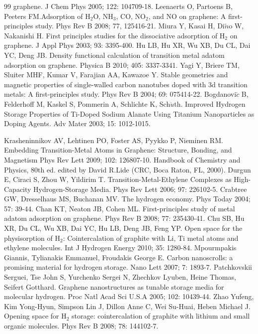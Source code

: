 {\begin{thebibliography} {99}
graphene. J Chem Phys 2005; 122: 104709-18.
Leenaerts O, Partoens B, Peeters FM.Adsorption of H$_{2}$O, NH$_{3}$, CO, NO$_{2}$, and NO on graphene: A first-principles
study. Phys Rev B 2008; 77, 125416-21.
Miura Y, Kasai H, Di$\tilde{n}$o W, Nakanishi H. First principles studies for the dissociative adsorption of H$_{2}$ on
graphene. J Appl Phys 2003; 93: 3395-400.
Hu LB, Hu XR, Wu XB, Du CL, Dai YC, Deng JB. Density functional calculation of transition metal adatom adsorption on graphene.
Physica B 2010; 405: 3337-3341.
Yagi Y, Briere TM, Sluiter MHF, Kumar V, Farajian AA, Kawazoe Y. Stable geometries and magnetic properties of single-walled carbon
nanotubes doped with 3d transition metals: A first-principles study.
Phys Rev B 2004; 69: 075414-22.
Bogdanovi$\acute{c}$ B, Felderhoff M, Kaskel S, Pommerin A, Schlichte K, Sch$\ddot{u}$th. Improved Hydrogen Storage Properties of Ti-Doped Sodium Alanate
Using Titanium Nanoparticles as Doping Agents. Adv Mater 2003; 15:
1012-1015.


Krasheninnikov AV, Lehtinen PO,  Foster AS,  Pyykko P, Nieminen RM. Embedding Transition-Metal Atoms in Graphene: Structure, Bonding, and Magnetism
 Phys Rev Lett 2009; 102: 126807-10.
Handbook of Chemistry and Physics, 80th ed. edited by David R.Lide (CRC, Boca Raton, FL, 2000).
Durgun E, Ciraci S, Zhou W, Yildirim T. Transition-Metal-Ethylene Complexes as High-Capacity Hydrogen-Storage
Media. Phys Rev Lett 2006; 97: 226102-5.
Crabtree GW, Dresselhaus MS,  Buchanan MV. The hydrogen economy. Phys Today 2004; 57: 39-44.
Chan KT, Neaton JB, Cohen ML. First-principles study of metal adatom adsorption on graphene. Phys Rev B 2008; 77: 235430-41.
Chu SB, Hu XR, Du CL, Wu XB, Dai YC, Hu LB, Deng JB,
Feng YP. Open space for the physisorption of H$_{2}$:
Cointercalation of graphite with Li, Ti metal atoms and ethylene
molecules. Int J Hydrogen Energy 2010; 35: 1280-84.
Mpourmpakis Giannis, Tylianakis Emmanuel,
Froudakis George E. Carbon nanoscrolls: a promising material for
hydrogen storage. Nano Lett 2007; 7: 1893-7.
Patchkovskii Serguei, Tse John S, Yurchenko Sergei N,
Zhechkov Lyuben, Heine Thomas, Seifert Gotthard. Graphene
nanostructures as tunable storage media for molecular hydrogen. Proc
Natl Acad Sci U.S.A 2005; 102: 10439-44.
Zhao Yufeng, Kim Yong-Hyun, Simpson Lin J, Dillon Anne C,
Wei Su-Huai, Heben Michael J. Opening space for H$_{2}$ storage:
cointercalation of graphite with lithium and small organic
molecules. Phys Rev B 2008; 78: 144102-7.
\end{thebibliography}}
